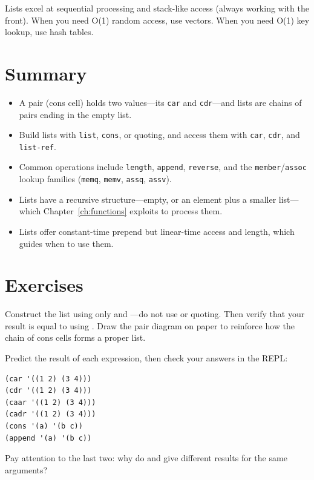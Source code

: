 Lists excel at sequential processing and stack-like access (always working with the front). When you need O(1) random access, use vectors. When you need O(1) key lookup, use hash tables.

\section*{Summary}

\begin{itemize}
    \item A pair (cons cell) holds two values---its \texttt{car} and \texttt{cdr}---and lists are chains of pairs ending in the empty list.
    \item Build lists with \texttt{list}, \texttt{cons}, or quoting, and access them with \texttt{car}, \texttt{cdr}, and \texttt{list-ref}.
    \item Common operations include \texttt{length}, \texttt{append}, \texttt{reverse}, and the \texttt{member}/\texttt{assoc} lookup families (\texttt{memq}, \texttt{memv}, \texttt{assq}, \texttt{assv}).
    \item Lists have a recursive structure---empty, or an element plus a smaller list---which Chapter~\ref{ch:functions} exploits to process them.
    \item Lists offer constant-time prepend but linear-time access and length, which guides when to use them.
\end{itemize}

\section*{Exercises}

\begin{exercise}
Construct the list  using only  and ---do not use  or quoting. Then verify that your result is equal to  using . Draw the pair diagram on paper to reinforce how the chain of cons cells forms a proper list.
\end{exercise}

\begin{exercise}
Predict the result of each expression, then check your answers in the REPL:

\begin{lstlisting}
(car '((1 2) (3 4)))
(cdr '((1 2) (3 4)))
(caar '((1 2) (3 4)))
(cadr '((1 2) (3 4)))
(cons '(a) '(b c))
(append '(a) '(b c))
\end{lstlisting}

Pay attention to the last two: why do  and  give different results for the same arguments?
\end{exercise}

